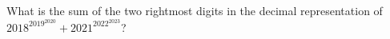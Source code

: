 What is the sum of the two rightmost digits in the decimal representation of $2018^{2019^{2020}}+2021^{2022^{2023}}$?
